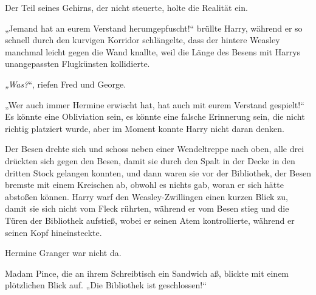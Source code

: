 Der Teil seines Gehirns, der nicht steuerte, holte die Realität ein.

„Jemand hat an eurem Verstand herumgepfuscht!“ brüllte Harry, während er so schnell durch den kurvigen Korridor schlängelte, dass der hintere Weasley manchmal leicht gegen die Wand knallte, weil die Länge des Besens mit Harrys unangepassten Flugkünsten kollidierte.

\emph{„Was?}“, riefen Fred und George.

„Wer auch immer Hermine erwischt hat, hat auch mit eurem Verstand gespielt!“ Es könnte eine Obliviation sein, es könnte eine falsche Erinnerung sein, die nicht richtig platziert wurde, aber im Moment konnte Harry nicht daran denken.

Der Besen drehte sich und schoss neben einer Wendeltreppe nach oben, alle drei drückten sich gegen den Besen, damit sie durch den Spalt in der Decke in den dritten Stock gelangen konnten, und dann waren sie vor der Bibliothek, der Besen bremste mit einem Kreischen ab, obwohl es nichts gab, woran er sich hätte abstoßen können. Harry warf den Weasley-Zwillingen einen kurzen Blick zu, damit sie sich nicht vom Fleck rührten, während er vom Besen stieg und die Türen der Bibliothek aufstieß, wobei er seinen Atem kontrollierte, während er seinen Kopf hineinsteckte.

Hermine Granger war nicht da.

Madam Pince, die an ihrem Schreibtisch ein Sandwich aß, blickte mit einem plötzlichen Blick auf. „Die Bibliothek ist geschlossen!“

